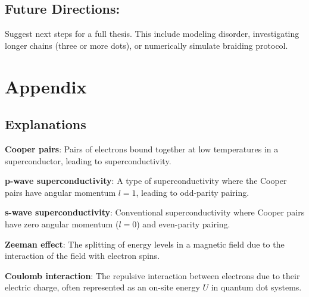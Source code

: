 \documentclass[11pt, letterpaper, titlepage]{article}
\begin{document}
\subsection{Future Directions:} Suggest next steps for a full thesis. This include modeling disorder, investigating longer chains (three or more dots), or numerically simulate braiding protocol.

\newpage
\section{Appendix}
\subsection{Explanations}

\textbf{Cooper pairs}: Pairs of electrons bound together at low temperatures in a superconductor, leading to superconductivity.

\textbf{p-wave superconductivity}: A type of superconductivity where the Cooper pairs have angular momentum \(l=1\), leading to odd-parity pairing.  

\textbf{s-wave superconductivity}: Conventional superconductivity where Cooper pairs have zero angular momentum (\(l=0\)) and even-parity pairing.  

\textbf{Zeeman effect}: The splitting of energy levels in a magnetic field due to the interaction of the field with electron spins.  

\textbf{Coulomb interaction}: The repulsive interaction between electrons due to their electric charge, often represented as an on-site energy \(U\) in quantum dot systems.
\end{document}
